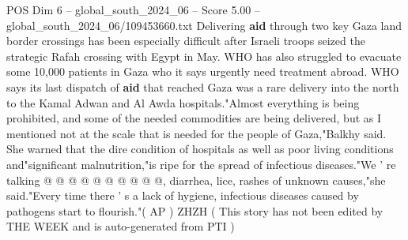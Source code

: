 \begin{textsample}{POS Dim 6 – global\_south\_2024\_06 – Score 5.00 – global\_south\_2024\_06/109453660.txt}
Delivering \textbf{aid} through two key Gaza land border crossings has been especially difficult after Israeli troops seized the strategic Rafah crossing with Egypt in May.
WHO has also struggled to evacuate some 10,000 patients in Gaza who it says urgently need treatment abroad.
WHO says its last dispatch of \textbf{aid} that reached Gaza was a rare delivery into the north to the Kamal Adwan and Al Awda hospitals."Almost everything is being prohibited, and some of the needed commodities are being delivered, but as I mentioned not at the scale that is needed for the people of Gaza,"Balkhy said.
She warned that the dire condition of hospitals as well as poor living conditions and"significant malnutrition,"is ripe for the spread of infectious diseases."We ' re talking @ @ @ @ @ @ @ @ @ @, diarrhea, lice, rashes of unknown causes,"she said."Every time there ' s a lack of hygiene, infectious diseases caused by pathogens start to flourish."( AP ) ZHZH ( This story has not been edited by THE WEEK and is auto-generated from PTI )

\end{textsample}
